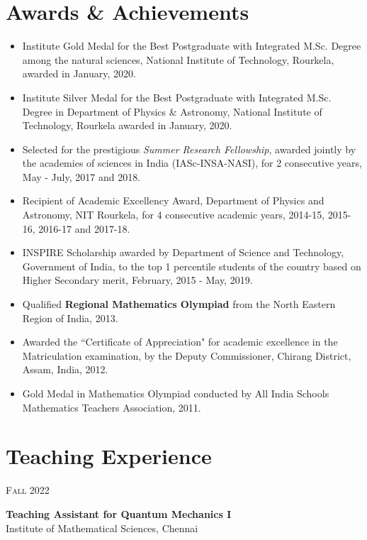 \documentclass[11pt, letterpaper]{article}
\newcommand{\entry}[4]{
	\ifthenelse{\isempty{#3}}
	{\slimentry{#1}{#2}}{
		\begin{minipage}[t]{.25\linewidth}
			\hfill \textsc{#1}
		\end{minipage}
		\hfill \vline \hfill
		\begin{minipage}[t]{.7\linewidth}
			{\bf #2} \\ \textsf{#3} \\ \footnotesize{#4}
		\end{minipage}\\
		\vspace{.2cm}
}}
\newcommand{\slimentry}[2]{
	\begin{minipage}[t]{.25\linewidth}
		\hfill \textsc{#1}
	\end{minipage}
	\hfill \vline \hfill
	\begin{minipage}[t]{.7\linewidth}
		#2
	\end{minipage}\\
	\vspace{.25cm}
}%
\newcommand{\imsc}{Institute of Mathematical Sciences, Chennai}
\begin{document}
	\section{Awards \& Achievements}
	\begin{itemize}
	\renewcommand{\labelitemi}{\color{blue}$\scriptstyle{\lozenge}$}
		\item Institute Gold Medal for the Best Postgraduate with Integrated M.Sc. Degree among the natural sciences, National Institute of Technology, Rourkela, awarded in January, 2020.

		\item Institute Silver Medal for the Best Postgraduate with Integrated M.Sc. Degree in Department of Physics \& Astronomy, National Institute of Technology, Rourkela awarded in January, 2020.

		\item Selected for the prestigious \emph{Summer Research Fellowship}, awarded jointly by the academies of sciences in India (IASc-INSA-NASI), for 2 consecutive years, May - July, 2017 and 2018.

		\item Recipient of Academic Excellency Award, Department of Physics and Astronomy, NIT Rourkela, for 4 consecutive academic years, 2014-15, 2015-16, 2016-17 and 2017-18.

		\item INSPIRE Scholarship awarded by Department of Science and Technology, Government of India, to the top 1 percentile students of the country based on Higher Secondary merit, February, 2015 - May, 2019.

		\item Qualified \textbf{Regional Mathematics Olympiad} from the North Eastern Region of India, 2013.

		\item Awarded the ``Certificate of Appreciation" for academic excellence in the Matriculation examination, by the Deputy Commissioner, Chirang District, Assam, India, 2012.

		\item Gold Medal in Mathematics Olympiad conducted by All India Schools Mathematics Teachers Association, 2011.
	\end{itemize}

	\section{Teaching Experience}
	\slimentry{Fall 2022}{\textbf{Teaching Assistant for Quantum Mechanics I} \\ \imsc}
\end{document}
